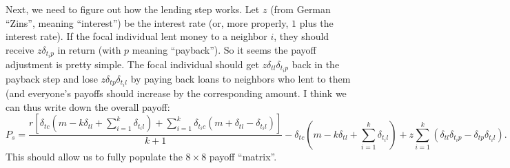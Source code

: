 \documentclass[14pt, a4paper, justified]{article}
\begin{document}
Next, we need to figure out how the lending step works.
Let $z$ (from German ``Zins'', meaning ``interest'') be the interest rate (or, more properly, $1$ plus the interest rate).
If the focal individual lent money to a neighbor $i$, they should receive $z \delta_{t_i p}$ in return (with $p$ meaning ``payback'').
So it seems the payoff adjustment is pretty simple.
The focal individual should get $z\delta_{tl} \delta_{t_i p}$ back in the payback step and lose $z \delta_{tp} \delta_{t_i l}$ by paying back loans to neighbors who lent to them (and everyone's payoffs should increase by the corresponding amount.
I think we can thus write down the overall payoff:
\begin{equation}
    P_s = \frac{r[\delta_{tc}(m - k\delta_{tl} + \sum_{i=1}^k \delta_{t_i l}) + \sum_{i=1}^k \delta_{t_i c} (m + \delta_{tl} - \delta_{t_i l})]}{k+1} - \delta_{tc}(m - k\delta_{tl} + \sum_{i=1}^k \delta_{t_i l}) + z\sum_{i=1}^k (\delta_{tl} \delta_{t_i p} - \delta_{tp} \delta_{t_i l}).
\end{equation}
This should allow us to fully populate the $8 \times 8$ payoff ``matrix''.



\end{document}
